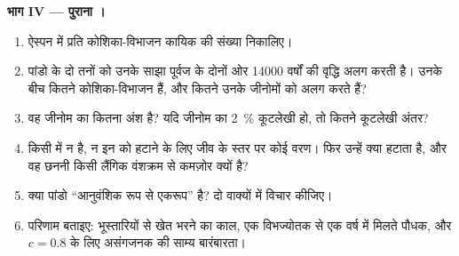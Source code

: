 \begin{problem}
\medskip
\noindent\textbf{भाग IV --- पुराना ।}
\begin{enumerate}[resume]
  \item ऐस्पन में प्रति कोशिका-विभाजन कायिक  की संख्या
        निकालिए।
  \item पांडो  के दो तनों को उनके साझा पूर्वज के दोनों ओर
        \num{14000} वर्षों की वृद्धि अलग करती है। उनके बीच कितने
        कोशिका-विभाजन हैं, और कितने  उनके जीनोमों को
        अलग करते हैं?
  \item वह जीनोम का कितना अंश है? यदि जीनोम का \qty{2}{\%}
        कूटलेखी हो, तो कितने कूटलेखी अंतर?
  \item किसी  में न  है, न इन  को
        हटाने के लिए जीव के स्तर पर कोई वरण। फिर उन्हें क्या हटाता है,
        और वह छननी किसी लैंगिक वंशक्रम से कमज़ोर क्यों है?
  \item क्या पांडो ``आनुवंशिक रूप से एकरूप'' है? दो वाक्यों में विचार कीजिए।
  \item परिणाम बताइए: भूस्तारियों से खेत भरने का काल, एक विभज्योतक से
        एक वर्ष में मिलते पौधक, और $c = 0.8$ के लिए असंगजनक की साम्य
        बारंबारता।
\end{enumerate}
\end{problem}
